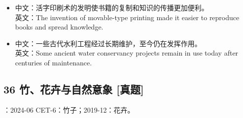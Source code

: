 \documentclass[a4paper,11pt,UTF8,fontset=none]{ctexart}
\begin{document}
\par

\begin{itemize}[leftmargin=1.7em,itemsep=1pt,parsep=0pt,topsep=2pt]
\item \noindent 中文：活字印刷术的发明使书籍的复制和知识的传播更加便利。\\ 英文：The invention of movable-type printing made it easier to reproduce books and spread knowledge.\par


\item \noindent 中文：一些古代水利工程经过长期维护，至今仍在发挥作用。\\ 英文：Some ancient water conservancy projects remain in use today after centuries of maintenance.\par


\end{itemize}

\subsection{36 竹、花卉与自然意象 {\color{AccentBlue} [真题]}}

\begin{tcolorbox}[enhanced,breakable,boxrule=0.35pt,colback=VeryPaleBlue,colframe=AccentBlue!40,left=7pt,right=7pt,top=4pt,bottom=4pt,borderline west={2pt}{0pt}{AccentBlue},before skip=4pt,after skip=6pt]
：2024-06 CET-6：竹子；2019-12：花卉。\par


\end{tcolorbox}
\end{document}
